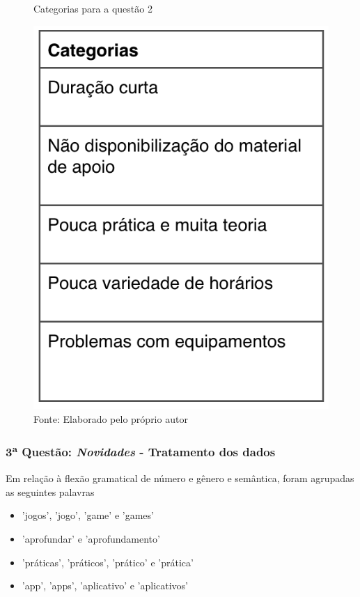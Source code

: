 \begin{figure}[H]
\caption{Categorias para a questão 2}
\centerline{\includegraphics[scale=0.75]{img/categoriasmelhorias}}
\label{fig:categoriasmelhorias}
\caption* {Fonte: Elaborado pelo próprio autor}
\end{figure}

\subsubsection*{3\textsuperscript{a} Questão: \textit{Novidades} - Tratamento dos dados }

Em relação à flexão gramatical de número e gênero e semântica, foram agrupadas as seguintes palavras

\begin{itemize}
\item 'jogos', 'jogo', 'game' e 'games'
\item 'aprofundar' e 'aprofundamento'
\item 'práticas', 'práticos', 'prático' e 'prática'
\item 'app', 'apps', 'aplicativo' e 'aplicativos'
\end{itemize}

